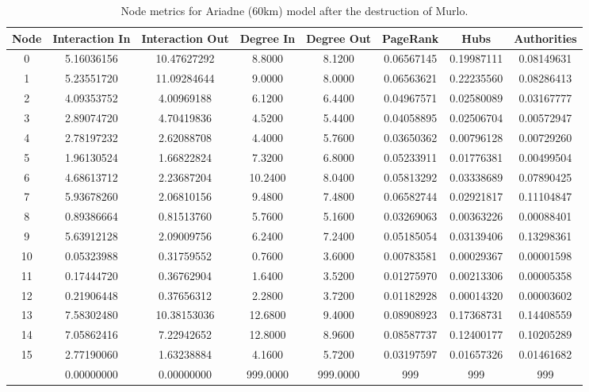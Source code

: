 \documentclass[12pt,a4paper]{thesis}
\begin{document}
\begin{table}[H]
\centering
\caption{Node metrics for Ariadne (60km) model after the destruction of Murlo.}
\tiny
\begin{tabular}{|c|c|c|c|c|c|c|c|}
\hline	Node	&	Interaction In	&	Interaction Out	&	Degree In	&	Degree Out	&	PageRank	&	Hubs	&	Authorities	\\
\hline	0	&	5.16036156	&	10.47627292	&	8.8000	&	8.1200 &	0.06567145	&	0.19987111	&	0.08149631	\\
\hline	1	&	5.23551720	&	11.09284644	&	9.0000	&	8.0000	&	0.06563621	&	0.22235560	&	0.08286413	\\
\hline	2	&	4.09353752	&	4.00969188	&	6.1200	&	6.4400	&	0.04967571	&	0.02580089	&	0.03167777	\\
\hline	3	&	2.89074720	&	4.70419836	&	4.5200	&	5.4400	&	0.04058895	&	0.02506704	&	0.00572947	\\
\hline	4	&	2.78197232	&	2.62088708	&	4.4000	&	5.7600	&	0.03650362	&	0.00796128	&	0.00729260	\\
\hline	5	&	1.96130524	&	1.66822824	&	7.3200	&	6.8000	&	0.05233911	&	0.01776381	&	0.00499504	\\
\hline	6	&	4.68613712	&	2.23687204	&	10.2400	&	8.0400	&	0.05813292	&	0.03338689	&	0.07890425	\\
\hline	7	&	5.93678260	&	2.06810156	&	9.4800	&	7.4800	&	0.06582744	&	0.02921817	&	0.11104847	\\
\hline	8	&	0.89386664	&	0.81513760	&	5.7600	&	5.1600	&	0.03269063	&	0.00363226	&	0.00088401	\\
\hline	9	&	5.63912128	&	2.09009756	&	6.2400	&	7.2400	&	0.05185054	&	0.03139406	&	0.13298361	\\
\hline	10	&	0.05323988	&	0.31759552	&	0.7600	&	3.6000	&	0.00783581	&	0.00029367	&	0.00001598	\\
\hline	11	&	0.17444720	&	0.36762904	&	1.6400	&	3.5200	&	0.01275970	&	0.00213306	&	0.00005358	\\
\hline	12	&	0.21906448	&	0.37656312	&	2.2800	&	3.7200	&	0.01182928	&	0.00014320	&	0.00003602	\\
\hline	13	&	7.58302480	&	10.38153036	&	12.6800	&	9.4000	&	0.08908923	&	0.17368731	&	0.14408559	\\
\hline	14	&	7.05862416	&	7.22942652	&	12.8000	&	8.9600	&	0.08587737	&	0.12400177	&	0.10205289	\\
\hline	15	&	2.77190060	&	1.63238884	&	4.1600	&	5.7200	&	0.03197597	&	0.01657326	&	0.01461682	\\
\rowcolor{yellow}
\hline	16	&	0.00000000	&	0.00000000	&	999.0000	&	999.0000	&	999	&	999	&	999	\\

\end{tabular}
\end{table}
\end{document}
